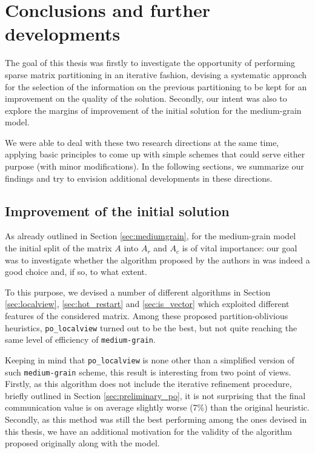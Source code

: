 \chapter{Conclusions and further developments} \label{chap:conclusions}

The goal of this thesis was firstly to investigate the opportunity of performing sparse matrix partitioning in an iterative fashion, devising a systematic approach for the selection of the information on the previous partitioning to be kept for an improvement on the quality of the solution. Secondly, our intent was also to explore the margins of improvement of the initial solution for the medium-grain model.

We were able to deal with these two research directions at the same time, applying basic principles to come up with simple schemes that could serve either purpose (with minor modifications). In the following sections, we summarize our findings and try to envision additional developments in these directions.

\section{Improvement of the initial solution} \label{sec:conclusions_po}

As already outlined in Section \ref{sec:mediumgrain}, for the medium-grain model the initial split of the matrix $A$ into $A_r$ and $A_c$ is of vital importance: our goal was to investigate whether the algorithm proposed by the authors in \cite{mediumgrain} was indeed a good choice and, if so, to what extent.

To this purpose, we devised a number of different algorithms in Section \ref{sec:localview}, \ref{sec:hot_restart} and \ref{sec:is_vector} which exploited different features of the considered matrix. Among these proposed partition-oblivious heuristics, \verb|po_localview| turned out to be the best, but not quite reaching the same level of efficiency of \verb|medium-grain|.

Keeping in mind that \verb|po_localview| is none other than a simplified version of such \verb|medium-grain| scheme, this result is interesting from two point of views. Firstly, as this algorithm does not include the iterative refinement procedure, briefly outlined in Section \ref{sec:preliminary_po}, it is not surprising that the final communication value is on average slightly worse (7\%) than the original heuristic. Secondly, as this method was still the best performing among the ones devised in this thesis, we have an additional motivation for the validity of the algorithm proposed originally along with the model.

